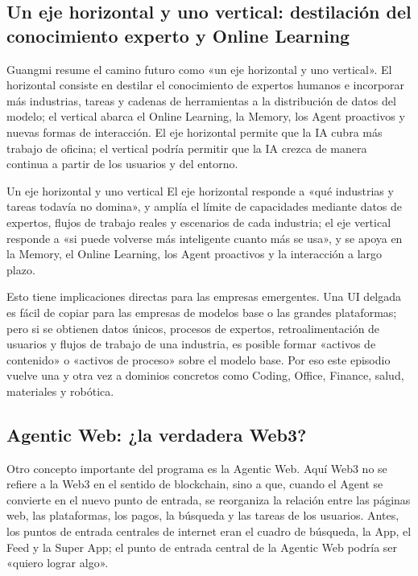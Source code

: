 \documentclass[a4paper]{article}
\begin{document}
\subsection{Un eje horizontal y uno vertical: destilación del conocimiento experto y Online Learning}

Guangmi resume el camino futuro como «un eje horizontal y uno vertical». El horizontal consiste en destilar el conocimiento de expertos humanos e incorporar más industrias, tareas y cadenas de herramientas a la distribución de datos del modelo; el vertical abarca el Online Learning, la Memory, los Agent proactivos y nuevas formas de interacción. El eje horizontal permite que la IA cubra más trabajo de oficina; el vertical podría permitir que la IA crezca de manera continua a partir de los usuarios y del entorno.

\begin{importantbox}{Un eje horizontal y uno vertical}
El eje horizontal responde a «qué industrias y tareas todavía no domina», y amplía el límite de capacidades mediante datos de expertos, flujos de trabajo reales y escenarios de cada industria; el eje vertical responde a «si puede volverse más inteligente cuanto más se usa», y se apoya en la Memory, el Online Learning, los Agent proactivos y la interacción a largo plazo.
\end{importantbox}

Esto tiene implicaciones directas para las empresas emergentes. Una UI delgada es fácil de copiar para las empresas de modelos base o las grandes plataformas; pero si se obtienen datos únicos, procesos de expertos, retroalimentación de usuarios y flujos de trabajo de una industria, es posible formar «activos de contenido» o «activos de proceso» sobre el modelo base. Por eso este episodio vuelve una y otra vez a dominios concretos como Coding, Office, Finance, salud, materiales y robótica.

\subsection{Agentic Web: ¿la verdadera Web3?}

Otro concepto importante del programa es la Agentic Web. Aquí Web3 no se refiere a la Web3 en el sentido de blockchain, sino a que, cuando el Agent se convierte en el nuevo punto de entrada, se reorganiza la relación entre las páginas web, las plataformas, los pagos, la búsqueda y las tareas de los usuarios. Antes, los puntos de entrada centrales de internet eran el cuadro de búsqueda, la App, el Feed y la Super App; el punto de entrada central de la Agentic Web podría ser «quiero lograr algo».
\end{document}
